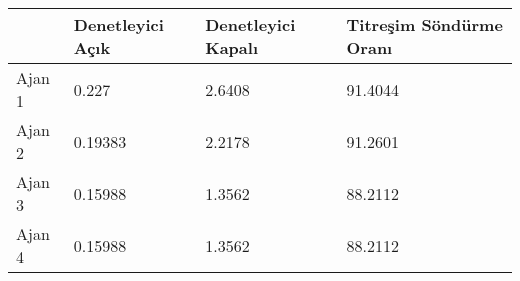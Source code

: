 \begin{tabular}{llll}
& Denetleyici Açık & Denetleyici Kapalı & Titreşim Söndürme Oranı \\ 
\hline 
Ajan 1 & 0.227 & 2.6408 & 91.4044 \\ 
Ajan 2 & 0.19383 & 2.2178 & 91.2601 \\ 
Ajan 3 & 0.15988 & 1.3562 & 88.2112 \\ 
Ajan 4 & 0.15988 & 1.3562 & 88.2112 \\ 
\hline 
\end{tabular}